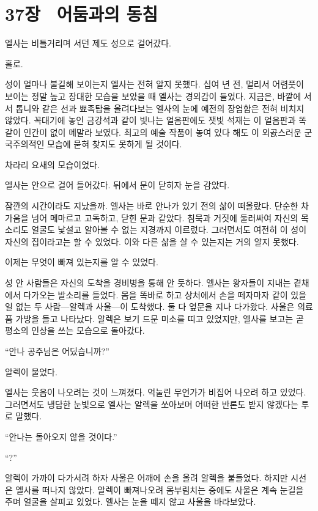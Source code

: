 

\chapter[37장  어둠과의 동침][37장\hspace*{.5em}어둠과의 동침]{37장 \ 어둠과의 동침}



엘사는 비틀거리며 서던 제도 성으로 걸어갔다.

홀로.

성이 얼마나 불길해 보이는지 엘사는 전혀 알지 못했다. 십여 년 전, 멀리서 어렴풋이 보이는 정말 높고 장대한 모습을 보았을 때 엘사는 경외감이 들었다. 지금은, 바깥에 서서 톱니와 같은 선과 뾰족탑을 올려다보는 엘사의 눈에 예전의 장엄함은 전혀 비치지 않았다. 꼭대기에 놓인 금강석과 같이 빛나는 얼음판에도 잿빛 석재는 이 얼음판과 똑같이 인간미 없이 메말라 보였다. 최고의 예술 작품이 놓여 있다 해도 이 외곬스러운 군국주의적인 모습에 묻혀 찾지도 못하게 될 것이다.

차라리 요새의 모습이었다.

엘사는 안으로 걸어 들어갔다. 뒤에서 문이 닫히자 눈을 감았다.

잠깐의 시간이라도 지났을까. 엘사는 바로 안나가 있기 전의 삶이 떠올랐다. 단순한 차가움을 넘어 메마르고 고독하고, 닫힌 문과 같았다. 침묵과 거짓에 둘러싸여 자신의 목소리도 얼굴도 낯설고 알아볼 수 없는 지경까지 이르렀다. 그러면서도 여전히 이 성이 자신의 집이라고는 할 수 있었다. 이와 다른 삶을 살 수 있는지는 거의 알지 못했다.

이제는 무엇이 빠져 있는지를 알 수 있었다.

성 안 사람들은 자신의 도착을 경비병을 통해 안 듯하다. 엘사는 왕자들이 지내는 곁채에서 다가오는 발소리를 들었다. 몸을 똑바로 하고 상처에서 손을 떼자마자 같이 있을 일 없는 두 사람—알렉과 사울—이 도착했다. 둘 다 옆문을 지나 다가왔다. 사울은 의료품 가방을 들고 나타났다. 알렉은 보기 드문 미소를 띠고 있었지만, 엘사를 보고는 곧 평소의 인상을 쓰는 모습으로 돌아갔다.

``안나 공주님은 어딨습니까?''

알렉이 물었다.

엘사는 웃음이 나오려는 것이 느껴졌다. 억눌린 무언가가 비집어 나오려 하고 있었다. 그러면서도 냉담한 눈빛으로 엘사는 알렉을 쏘아보며 어떠한 반론도 받지 않겠다는 투로 말했다.

``안나는 돌아오지 않을 것이다.''

``?''

알렉이 가까이 다가서려 하자 사울은 어깨에 손을 올려 알렉을 붙들었다. 하지만 시선은 엘사를 떠나지 않았다. 알렉이 빠져나오려 몸부림치는 중에도 사울은 계속 눈길을 주며 얼굴을 살피고 있었다. 엘사는 눈을 떼지 않고 사울을 바라보았다.

